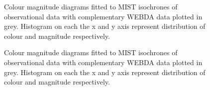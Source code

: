 \begin{figure}
  \caption{Colour magnitude diagrams fitted to MIST isochrones of observational data with complementary WEBDA data plotted in grey. Histogram on each the x and y axis represent distribution of colour and magnitude respectively. }
  \label{fig:obs_CMDs}
\end{figure}

\begin{figure}
\end{figure}

\begin{figure}
  \caption{Colour magnitude diagrams fitted to MIST isochrones of observational data with complementary WEBDA data plotted in grey. Histogram on each the x and y axis represent distribution of colour and magnitude respectively. }
  \label{fig:obs_CMDs_2}
\end{figure}



